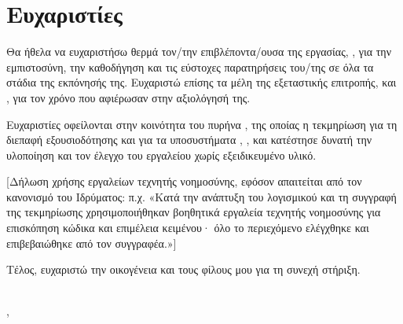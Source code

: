 \chapter*{Ευχαριστίες}
\thispagestyle{plain}

Θα ήθελα να ευχαριστήσω θερμά τον/την επιβλέποντα/ουσα της εργασίας,
\Supervisor, για την εμπιστοσύνη, την καθοδήγηση και τις εύστοχες παρατηρήσεις
του/της σε όλα τα στάδια της εκπόνησής της. Ευχαριστώ επίσης τα μέλη της
εξεταστικής επιτροπής, \MemberA{} και \MemberB, για τον χρόνο που αφιέρωσαν στην
αξιολόγησή της.

Ευχαριστίες οφείλονται στην κοινότητα του πυρήνα , της οποίας η
τεκμηρίωση για τη διεπαφή εξουσιοδότησης  και για τα υποσυστήματα
, ,  και  κατέστησε δυνατή την
υλοποίηση και τον έλεγχο του εργαλείου χωρίς εξειδικευμένο υλικό.

[Δήλωση χρήσης εργαλείων τεχνητής νοημοσύνης, εφόσον απαιτείται από τον
κανονισμό του Ιδρύματος: π.χ. «Κατά την ανάπτυξη του λογισμικού και τη συγγραφή
της τεκμηρίωσης χρησιμοποιήθηκαν βοηθητικά εργαλεία τεχνητής νοημοσύνης για
επισκόπηση κώδικα και επιμέλεια κειμένου· όλο το περιεχόμενο ελέγχθηκε και
επιβεβαιώθηκε από τον συγγραφέα.»]

Τέλος, ευχαριστώ την οικογένεια και τους φίλους μου για τη συνεχή στήριξη.

\vspace{1cm}
\begin{flushright}
  \Author\\
  \City, \ThesisDate
\end{flushright}
